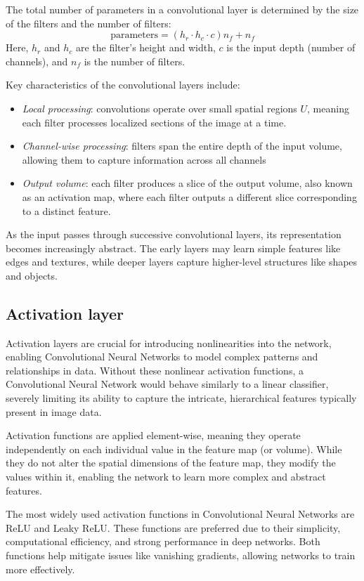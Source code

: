 The total number of parameters in a convolutional layer is determined by the size of the filters and the number of filters:
\[\text{parameters}=(h_r\cdot h_c\cdot c)n_f+n_f\]
Here, $h_r$ and $h_c$ are the filter's height and width, $c$  is the input depth (number of channels), and $n_f$ is the number of filters.

Key characteristics of the convolutional layers include:
\begin{itemize}
    \item \textit{Local processing}: convolutions operate over small spatial regions $U$, meaning each filter processes localized sections of the image at a time.
    \item \textit{Channel-wise processing}: filters span the entire depth of the input volume, allowing them to capture information across all channels
    \item \textit{Output volume}: each filter produces a slice of the output volume, also known as an activation map, where each filter outputs a different slice corresponding to a distinct feature.
\end{itemize}
As the input passes through successive convolutional layers, its representation becomes increasingly abstract. 
The early layers may learn simple features like edges and textures, while deeper layers capture higher-level structures like shapes and objects. 

\subsection{Activation layer}
Activation layers are crucial for introducing nonlinearities into the network, enabling Convolutional Neural Networks to model complex patterns and relationships in data.
Without these nonlinear activation functions, a Convolutional Neural Network would behave similarly to a linear classifier, severely limiting its ability to capture the intricate, hierarchical features typically present in image data.

Activation functions are applied element-wise, meaning they operate independently on each individual value in the feature map (or volume). 
While they do not alter the spatial dimensions of the feature map, they modify the values within it, enabling the network to learn more complex and abstract features.

The most widely used activation functions in Convolutional Neural Networks are ReLU and Leaky ReLU. 
These functions are preferred due to their simplicity, computational efficiency, and strong performance in deep networks. 
Both functions help mitigate issues like vanishing gradients, allowing networks to train more effectively.

